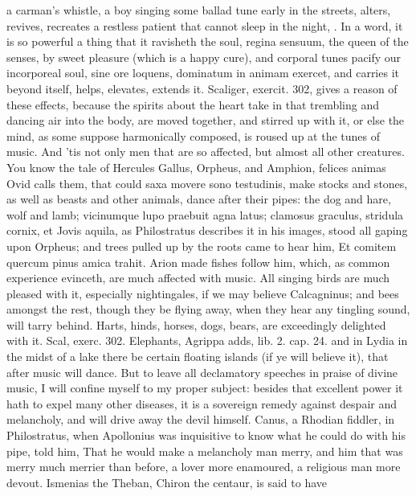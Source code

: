 {a carman's whistle, a boy singing some ballad tune early in the
streets, alters, revives, recreates a restless patient that cannot
sleep in the night, \etc{}. In a word, it is so powerful a thing that it
ravisheth the soul, regina sensuum, the queen of the senses, by sweet
pleasure (which is a happy cure), and corporal tunes pacify our
incorporeal soul, sine ore loquens, dominatum in animam exercet, and
carries it beyond itself, helps, elevates, extends it. Scaliger,
exercit. 302, gives a reason of these effects, because the
spirits about the heart take in that trembling and dancing air into the
body, are moved together, and stirred up with it, or else the mind, as
some suppose harmonically composed, is roused up at the tunes of music.
And 'tis not only men that are so affected, but almost all other
creatures. You know the tale of Hercules Gallus, Orpheus, and Amphion,
felices animas Ovid calls them, that could saxa movere sono testudinis,
\etc{} make stocks and stones, as well as beasts and other animals, dance
after their pipes: the dog and hare, wolf and lamb; vicinumque lupo
praebuit agna latus; clamosus graculus, stridula cornix, et Jovis
aquila, as Philostratus describes it in his images, stood all gaping
upon Orpheus; and trees pulled up by the roots came to hear him,
Et comitem quercum pinus amica trahit.
Arion made fishes follow him, which, as common experience evinceth,
 are much affected with music. All singing birds are much pleased
with it, especially nightingales, if we may believe Calcagninus; and
bees amongst the rest, though they be flying away, when they hear any
tingling sound, will tarry behind. Harts, hinds, horses, dogs,
bears, are exceedingly delighted with it. Scal, exerc. 302. Elephants,
Agrippa adds, lib. 2. cap. 24. and in Lydia in the midst of a lake
there be certain floating islands (if ye will believe it), that after
music will dance.
But to leave all declamatory speeches in praise of divine music,
I will confine myself to my proper subject: besides that excellent
power it hath to expel many other diseases, it is a sovereign remedy
against  despair and melancholy, and will drive away the devil
himself. Canus, a Rhodian fiddler, in Philostratus, when
Apollonius was inquisitive to know what he could do with his pipe, told
him, That he would make a melancholy man merry, and him that was merry
much merrier than before, a lover more enamoured, a religious man more
devout. Ismenias the Theban, Chiron the centaur, is said to have
}
